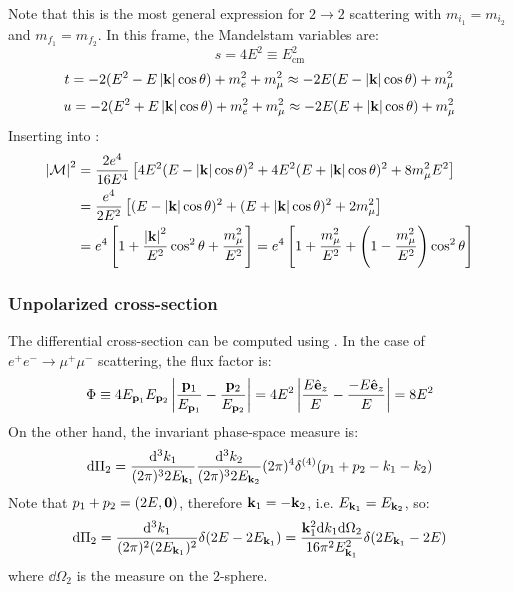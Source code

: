 Note that this is the most general expression for $ 2 \rightarrow 2 $ scattering with $ m_{i_1} = m_{i_2} $ and $ m_{f_1} = m_{f_2} $. In this frame, the Mandelstam variables are:
\begin{equation*}
  s = 4E^2 \equiv E_\text{cm}^2
\end{equation*}
\begin{equation*}
  t = -2 (E^2 - E \left\lvert\mathbf{k}\right\rvert \cos \theta) + m_e^2 + m_\mu^2 \approx -2E (E - \left\lvert\mathbf{k}\right\rvert \cos \theta) + m_\mu^2
\end{equation*}
\begin{equation*}
  u = -2 (E^2 + E \left\lvert\mathbf{k}\right\rvert \cos \theta) + m_e^2 + m_\mu^2 \approx -2E (E + \left\lvert\mathbf{k}\right\rvert \cos \theta) + m_\mu^2
\end{equation*}
Inserting into :
\begin{equation*}
  \begin{split}
    \left\lvert\mathcal{M}\right\rvert^2
    & = \frac{2e^4}{16 E^4} \left[ 4E^2 (E - \left\lvert\mathbf{k}\right\rvert \cos \theta)^2 + 4E^2 (E + \left\lvert\mathbf{k}\right\rvert \cos \theta)^2 + 8 m_\mu^2 E^2 \right] \\
    & = \frac{e^4}{2E^2} \left[ (E - \left\lvert\mathbf{k}\right\rvert \cos \theta)^2 + (E + \left\lvert\mathbf{k}\right\rvert \cos \theta)^2 + 2m_\mu^2 \right] \\
    & = e^4 \left[ 1 + \frac{\left\lvert\mathbf{k}\right\rvert^2}{E^2} \cos^2 \theta + \frac{m_\mu^2}{E^2} \right] = e^4 \left[ 1 + \frac{m_\mu^2}{E^2} + \left( 1 - \frac{m_\mu^2}{E^2} \right) \cos^2 \theta \right]
  \end{split}
\end{equation*}

\subsubsection{Unpolarized cross-section}

The differential cross-section can be computed using . In the case of $ e^+ e^- \rightarrow \mu^+ \mu^- $ scattering, the flux factor is:
\begin{equation*}
  \Phi \equiv 4 E_{\mathbf{p}_1} E_{\mathbf{p}_2} \left\lvert\frac{\mathbf{p}_1}{E_{\mathbf{p}_1}} - \frac{\mathbf{p}_2}{E_{\mathbf{p}_2}}\right\rvert = 4E^2 \left\lvert\frac{E \hat{\mathbf{e}}_z}{E} - \frac{-E \hat{\mathbf{e}}_z}{E}\right\rvert = 8E^2
\end{equation*}
On the other hand, the invariant phase-space measure is:
\begin{equation*}
  \mathrm{d} \Pi_2 = \frac{\mathrm{d}^3k_1}{(2\pi)^3 2E_{\mathbf{k}_1}} \frac{\mathrm{d}^3k_2}{(2\pi)^3 2E_{\mathbf{k}_2}} (2\pi)^4 \delta^{(4)}(p_1 + p_2 - k_1 - k_2)
\end{equation*}
Note that $ p_1 + p_2 = (2E, \mathbf{0}) $, therefore $ \mathbf{k}_1 = - \mathbf{k}_2 $, i.e. $ E_{\mathbf{k}_1} = E_{\mathbf{k}_2} $, so:
\begin{equation*}
    \mathrm{d} \Pi_2 = \frac{\mathrm{d}^3k_1}{(2\pi)^2 (2E_{\mathbf{k}_1})^2} \delta(2E - 2E_{\mathbf{k}_1}) = \frac{\mathbf{k}_1^2 \mathrm{d} k_1 \mathrm{d} \Omega_2}{16 \pi^2 E_{\mathbf{k}_1}^2} \delta(2E_{\mathbf{k}_1} - 2E)
\end{equation*}
where $ \dd \Omega_2 $ is the measure on the $ 2 $-sphere\footnotemark.

